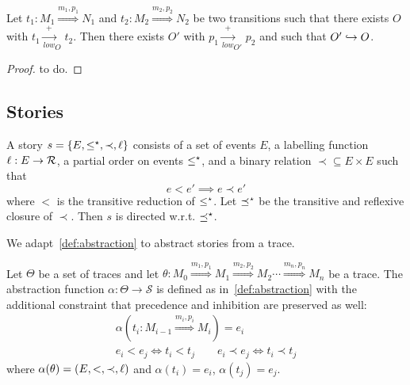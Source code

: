 \begin{lemma}
  \label{lem:prec}
  Let $t_1:M_1\overset{m_1,p_1}{\Rightarrow} N_1$ and $t_2:M_2\overset{m_2,p_2}{\Rightarrow} N_2$ be two transitions such that there exists $O$ with $t_1\xrightarrow[low]{+} _O t_2$. Then there exists $O'$ with $p_1\xrightarrow[low]{+} _{O'} p_2$ and such that $O'\hookrightarrow O$.
\end{lemma}
\begin{mdframed}[backgroundcolor=blue!20]
  \begin{proof}
    to do.
  \end{proof}
\end{mdframed}

\subsection{Stories}

\begin{definition}
  A story $s=\{E,\leq^{\star},\prec,\ell\}$ consists of a set of events $E$, a labelling function $\ell:E\to\mathcal{R}$, a partial order on events $\leq^{\star}$, and a binary relation $\prec\subseteq E\times E$ such that
\[
e< e'\implies e\prec e'
\]
where $<$ is the transitive reduction of $\leq^{\star}$. Let $\preceq^{\star}$ be the transitive and reflexive closure of $\prec$. Then $s$ is directed w.r.t. $\preceq^{\star}$.
\end{definition}

We adapt~\autoref{def:abstraction} to abstract stories from a trace.
\begin{definition}
  \label{def:abstraction_stories}
  Let $\Theta$ be a set of traces and let $\theta:M_0\overset{m_1,p_1}{\Rightarrow} M_1\overset{m_2,p_2}{\Rightarrow} M_2 \cdots \overset{m_n,p_n}{\Rightarrow} M_n$ be a trace. The abstraction function $\alpha:\Theta\to\mathcal{S}$ is defined as in~\autoref{def:abstraction} with the additional constraint that precedence and inhibition are preserved as well:
    \begin{align*}
      \alpha(t_i:M_{i-1}\overset{m_{i},p_{i}}{\Rightarrow}M_i) = e_i \\
      e_i < e_j \iff t_i < t_j \qquad
      e_i \prec e_j \iff t_i \prec t_j
    \end{align*}
    where $\alpha(\theta) = (E,<,\prec,\ell)$ and $\alpha(t_i)=e_i$, $\alpha(t_j)=e_j$.
\end{definition}

